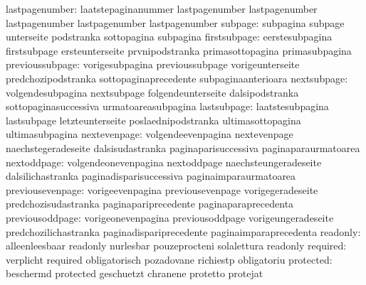           lastpagenumber: laatstepaginanummer       lastpagenumber
                           lastpagenumber            lastpagenumber
                           lastpagenumber            lastpagenumber
                  subpage: subpagina                 subpage
                           unterseite                podstranka
                           sottopagina               subpagina
             firstsubpage: eerstesubpagina           firstsubpage
                           ersteunterseite           prvnipodstranka
                           primasottopagina          primasubpagina
          previoussubpage: vorigesubpagina           previoussubpage
                           vorigeunterseite          predchozipodstranka
                           sottopaginaprecedente     subpaginaanterioara
              nextsubpage: volgendesubpagina         nextsubpage
                           folgendeunterseite        dalsipodstranka
                           sottopaginasuccessiva     urmatoareasubpagina
              lastsubpage: laatstesubpagina          lastsubpage
                           letzteunterseite          poslaednipodstranka
                           ultimasottopagina         ultimasubpagina
             nextevenpage: volgendeevenpagina        nextevenpage
                           naechstegeradeseite       dalsisudastranka
                           paginaparisuccessiva      paginaparaurmatoarea
              nextoddpage: volgendeonevenpagina      nextoddpage
                           naechsteungeradeseite     dalsilichastranka
                           paginadisparisuccessiva   paginaimparaurmatoarea
         previousevenpage: vorigeevenpagina          previousevenpage
                           vorigegeradeseite         predchozisudastranka
                           paginapariprecedente      paginaparaprecedenta
          previousoddpage: vorigeonevenpagina        previousoddpage
                           vorigeungeradeseite       predchozilichastranka
                           paginadispariprecedente   paginaimparaprecedenta
                 readonly: alleenleesbaar            readonly
                           nurlesbar                 pouzeprocteni
                           solalettura               readonly
                 required: verplicht                 required
                           obligatorisch             pozadovane
                           richiestp                 obligatoriu
                protected: beschermd                 protected
                           geschuetzt                chranene
                           protetto                  protejat
